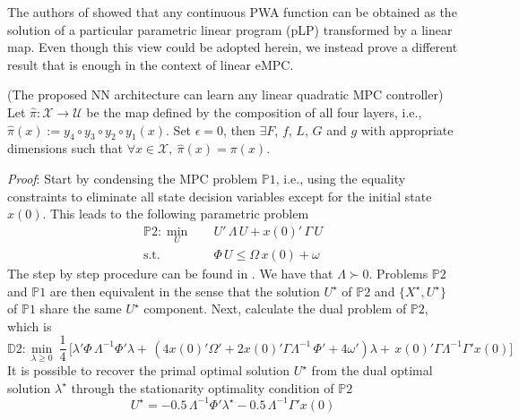 The authors of \cite{hempel2013every} showed that any continuous PWA function can be obtained as the solution of a particular parametric linear program (pLP) transformed by a linear map. Even though this view could be adopted herein, we instead prove a different result that is enough in the context of linear eMPC.

\begin{theorem}
	(The proposed NN architecture can learn any linear quadratic MPC controller) Let $\hat{\pi}: \mathcal{X} \rightarrow \mathcal{U}$ be the map defined by the composition of all four layers, i.e., $\hat{\pi}(x) := y_4 \circ y_3 \circ y_2 \circ y_1(x)$. Set $\epsilon = 0$, then $\exists F$, $f$, $L$, $G$ and $g$ with appropriate dimensions such that $\forall x \in \mathcal{X}, \ \hat{\pi}(x) = \pi(x)$.
\end{theorem}

\textit{Proof}: Start by condensing the MPC problem $\mathds{P}1$, i.e., using the equality constraints to eliminate all state decision variables except for the initial state $x(0)$. This leads to the following parametric problem
\begin{subequations}
	\begin{align}
		\mathds{P}2: \min_{U} \quad & U' \, \Lambda \, U + x(0)' \, \Gamma \, U\\
		\text{s.t.} \quad & \Phi \, U \leq  \Omega \, x(0) + \omega \label{eq:constr}
	\end{align}
\end{subequations}
The step by step procedure can be found in \cite{wright2019efficient}. We have that $\Lambda \succ 0$. Problems $\mathds{P}2$ and $\mathds{P}1$ are then equivalent in the sense that the solution $U^\star$ of $\mathds{P}2$ and $\{X^\star,U^\star\}$ of $\mathds{P}1$ share the same $U^\star$ component. Next, calculate the dual problem of $\mathds{P}2$, which is
\begin{equation}
		\label{eq:dualMPC}
		\mathds{D}2: \min_{\lambda \geq 0} \ \frac{1}{4} \, \big[ \lambda'\Phi \, \Lambda^{-1}\Phi'\lambda + \, (4 x(0)'\Omega' +2 x(0)'\Gamma \Lambda^{-1} \, \Phi' + 4 \omega')\lambda + \, x(0)'\Gamma \Lambda^{-1} \Gamma'x(0) \big]
\end{equation}
It is possible to recover the primal optimal solution $U^\star$ from the dual optimal solution $\lambda^\star$ through the stationarity optimality condition of $\mathds{P}2$
\begin{equation}
	\label{eq:stationarity}
	U^\star = -0.5 \, \Lambda^{-1}\Phi' \lambda^{\star} -0.5 \, \Lambda^{-1} \Gamma'x(0)
\end{equation}

